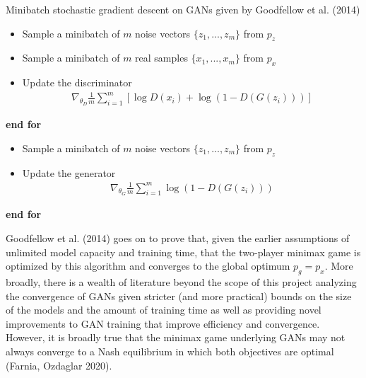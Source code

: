 \documentclass[12pt, reqno]{amsart}
\begin{document}
\begin{algorithm}[H]
    \caption*{Minibatch stochastic gradient descent on GANs given by Goodfellow et al. (2014)}
    \begin{algorithmic}
                \begin{itemize}
                    \setlength\itemindent{25pt}
                    \item Sample a minibatch of $m$ noise vectors $\{z_1, ..., z_m\}$ from $p_z$
                    \item Sample a minibatch of $m$ real samples $\{x_1, ..., x_m\}$ from $p_x$
                    \item Update the discriminator
                    \begin{align*}
                        \nabla_{\theta_D} \frac{1}{m} \sum_{i=1}^{m} \left[\log D(x_i) + \log(1 - D(G(z_i)))\right]
                    \end{align*}
                \end{itemize}
            \EndFor
            \State \textbf{end for}
            \begin{itemize}
                \item Sample a minibatch of $m$ noise vectors $\{z_1, ..., z_m\}$ from $p_z$
                \item Update the generator
                \begin{align*}
                    \nabla_{\theta_G} \frac{1}{m} \sum_{i=1}^{m} \log(1 - D(G(z_i)))
                \end{align*}
            \end{itemize}
        \EndFor
        \State \textbf{end for}
    \end{algorithmic}
\end{algorithm}

Goodfellow et al. (2014) goes on to prove that, given the earlier assumptions of unlimited model capacity and training time, that the two-player minimax game is optimized by this algorithm and converges to the global optimum $p_g = p_x$. More broadly, there is a wealth of literature beyond the scope of this project analyzing the convergence of GANs given stricter (and more practical) bounds on the size of the models and the amount of training time as well as providing novel improvements to GAN training that improve efficiency and convergence. However, it is broadly true that the minimax game underlying GANs may not always converge to a Nash equilibrium in which both objectives are optimal (Farnia, Ozdaglar 2020). \\
\end{document}
